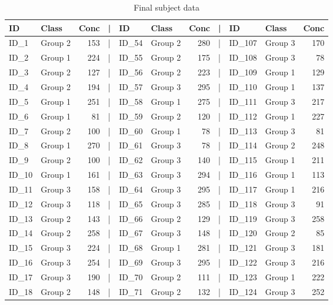 \documentclass[smallextended]{svjour3}       %
\begin{document}
\begin{table}

\caption{\label{tab:show-table}Final subject data}
\centering
\begin{tabular}[t]{llrlllrlllr}
\toprule
ID & Class & Conc & | & ID & Class & Conc & | & ID & Class & Conc\\
\midrule
ID\_1 & Group 2 & 153 & | & ID\_54 & Group 2 & 280 & | & ID\_107 & Group 3 & 170\\
ID\_2 & Group 1 & 224 & | & ID\_55 & Group 2 & 175 & | & ID\_108 & Group 3 & 78\\
ID\_3 & Group 2 & 127 & | & ID\_56 & Group 2 & 223 & | & ID\_109 & Group 1 & 129\\
ID\_4 & Group 2 & 194 & | & ID\_57 & Group 3 & 295 & | & ID\_110 & Group 1 & 137\\
ID\_5 & Group 1 & 251 & | & ID\_58 & Group 1 & 275 & | & ID\_111 & Group 3 & 217\\
\addlinespace
ID\_6 & Group 1 & 81 & | & ID\_59 & Group 2 & 120 & | & ID\_112 & Group 1 & 227\\
ID\_7 & Group 2 & 100 & | & ID\_60 & Group 1 & 78 & | & ID\_113 & Group 3 & 81\\
ID\_8 & Group 1 & 270 & | & ID\_61 & Group 3 & 78 & | & ID\_114 & Group 2 & 248\\
ID\_9 & Group 2 & 100 & | & ID\_62 & Group 3 & 140 & | & ID\_115 & Group 1 & 211\\
ID\_10 & Group 1 & 161 & | & ID\_63 & Group 3 & 294 & | & ID\_116 & Group 1 & 113\\
\addlinespace
ID\_11 & Group 3 & 158 & | & ID\_64 & Group 3 & 295 & | & ID\_117 & Group 1 & 216\\
ID\_12 & Group 3 & 118 & | & ID\_65 & Group 3 & 285 & | & ID\_118 & Group 3 & 91\\
ID\_13 & Group 2 & 143 & | & ID\_66 & Group 2 & 129 & | & ID\_119 & Group 3 & 258\\
ID\_14 & Group 2 & 258 & | & ID\_67 & Group 3 & 148 & | & ID\_120 & Group 2 & 85\\
ID\_15 & Group 3 & 224 & | & ID\_68 & Group 1 & 281 & | & ID\_121 & Group 3 & 181\\
\addlinespace
ID\_16 & Group 3 & 254 & | & ID\_69 & Group 3 & 295 & | & ID\_122 & Group 3 & 216\\
ID\_17 & Group 3 & 190 & | & ID\_70 & Group 2 & 111 & | & ID\_123 & Group 1 & 222\\
ID\_18 & Group 2 & 148 & | & ID\_71 & Group 2 & 132 & | & ID\_124 & Group 3 & 252\\

\end{tabular}
\end{table}
\end{document}
